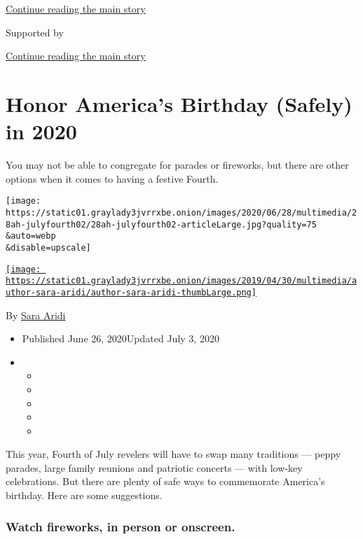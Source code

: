 \protect\hyperlink{after-top}{Continue reading the main story}

Supported by

\protect\hyperlink{after-sponsor}{Continue reading the main story}

\hypertarget{honor-americas-birthday-safely-in-2020}{%
\section{Honor America's Birthday (Safely) in
2020}\label{honor-americas-birthday-safely-in-2020}}

You may not be able to congregate for parades or fireworks, but there
are other options when it comes to having a festive Fourth.

\texttt{[image: https://static01.graylady3jvrrxbe.onion/images/2020/06/28/multimedia/28ah-julyfourth02/28ah-julyfourth02-articleLarge.jpg?quality=75\\\&auto=webp\\\&disable=upscale]}

\href{https://www.nytimes3xbfgragh.onion/by/sara-aridi}{\texttt{[image: https://static01.graylady3jvrrxbe.onion/images/2019/04/30/multimedia/author-sara-aridi/author-sara-aridi-thumbLarge.png]}}

By \href{https://www.nytimes3xbfgragh.onion/by/sara-aridi}{Sara Aridi}

\begin{itemize}
\item
  Published June 26, 2020Updated July 3, 2020
\item
  \begin{itemize}
  \item
  \item
  \item
  \item
  \item
  \end{itemize}
\end{itemize}

This year, Fourth of July revelers will have to swap many traditions ---
peppy parades, large family reunions and patriotic concerts --- with
low-key celebrations. But there are plenty of safe ways to commemorate
America's birthday. Here are some suggestions.

\hypertarget{watch-fireworks-in-person-or-onscreen}{%
\subsubsection{Watch fireworks, in person or
onscreen.}\label{watch-fireworks-in-person-or-onscreen}}

